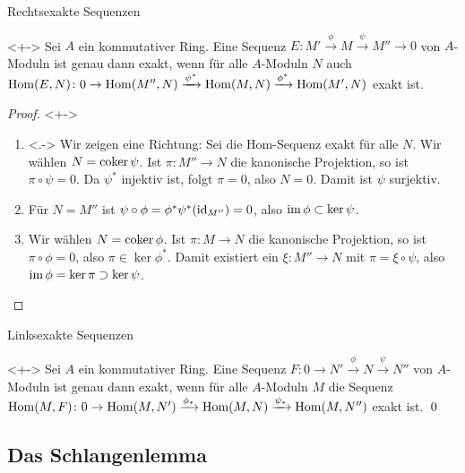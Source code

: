\begin{frame}{Rechtsexakte Sequenzen}
	\begin{proposition}<+->
		Sei \(A\) ein kommutativer Ring. Eine Sequenz
		\(E\colon M' \xrightarrow\phi M \xrightarrow\psi M'' \to 0\) von \(A\)-Moduln ist
		genau dann exakt, wenn für alle \(A\)-Moduln \(N\) auch
		\(\operatorname{Hom}(E, N)\colon 0 \to \operatorname{Hom}(M'', N) \xrightarrow{\psi^*} \operatorname{Hom}(M, N) \xrightarrow{\phi^*} \operatorname{Hom}(M', N)\)
		exakt ist.
	\end{proposition}
	\begin{proof}<+->
		\begin{enumerate}[<+->]
		\item<.->
			Wir zeigen eine Richtung: Sei die Hom-Sequenz exakt für alle \(N\). Wir wählen \(N = \operatorname{coker} \psi\).
			Ist \(\pi\colon M'' \to N\) die kanonische Projektion, so ist
			\(\pi \circ \psi = 0\). Da \(\psi^*\) injektiv ist, folgt \(\pi = 0\), also
			\(N = 0\). Damit ist \(\psi\) surjektiv.
		\item
			Für \(N = M''\) ist \(\psi \circ \phi = \phi^* \psi^*(\operatorname{id}_{M''}) = 0\),
			also \(\operatorname{im} \phi \subset \ker \psi\).
		\item
			Wir wählen \(N = \operatorname{coker} \phi\). Ist \(\pi\colon M \to N\) die kanonische Projektion,
			so ist \(\pi \circ \phi = 0\), also \(\pi \in \ker \phi^*\). Damit existiert ein
			\(\xi\colon M'' \to N\) mit \(\pi = \xi \circ \psi\), also \(\operatorname{im} \phi = \ker \pi \supset
			\ker \psi\).
			\qedhere
		\end{enumerate}
	\end{proof}
\end{frame}

\begin{frame}{Linksexakte Sequenzen}
	\begin{proposition}<+->
		Sei \(A\) ein kommutativer Ring. Eine Sequenz
		\(F\colon 0 \to N' \xrightarrow\phi N \xrightarrow\psi N''\) von \(A\)-Moduln ist
		genau dann exakt, wenn für alle \(A\)-Moduln \(M\) die Sequenz
		\(\operatorname{Hom}(M, F)\colon 0 \to \operatorname{Hom}(M, N') \xrightarrow{\phi_*} \operatorname{Hom}(M, N) \xrightarrow{\psi_*} \operatorname{Hom}(M, N'')\)
		exakt ist.
		\qed
	\end{proposition}
\end{frame}

\subsection{Das Schlangenlemma}

